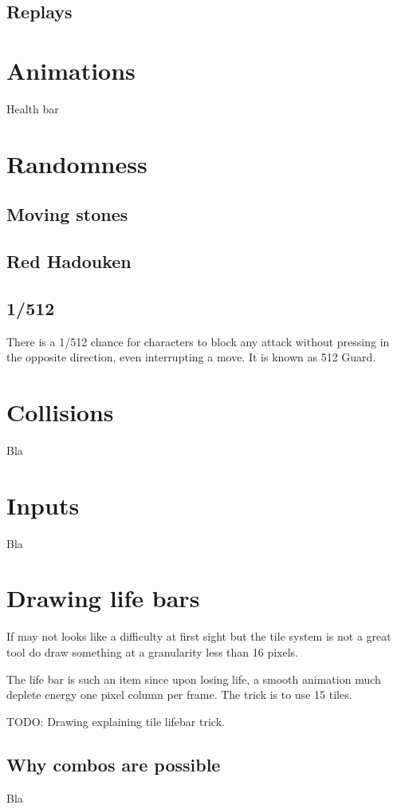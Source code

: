 \subsection{Replays}

\section{Animations}
Health bar

\section{Randomness}
\subsection{Moving stones}
\subsection{Red Hadouken}
\subsection{1/512}

There is a 1/512 chance for characters to block any attack without pressing in the opposite direction, even interrupting a move. It is known as 512 Guard.

\section{Collisions}
Bla
\section{Inputs}
Bla

\section{Drawing life bars}
If may not looks like a difficulty at first sight but the tile system is not a great tool do draw something at a granularity less than 16 pixels. 

The life bar is such an item since upon losing life, a smooth animation much deplete energy one pixel column per frame. The trick is to use 15 tiles.

TODO: Drawing explaining tile lifebar trick.


\subsection{Why combos are possible}
Bla
